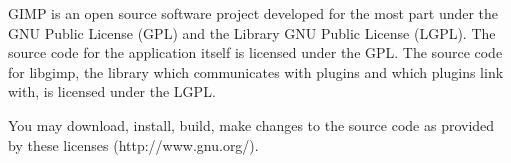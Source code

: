 GIMP is an open source software project developed for the most part under the
GNU Public License (GPL) and the Library GNU Public License (LGPL). The source
code for the application itself is licensed under the GPL. The source code for
libgimp, the library which communicates with plugins and which plugins link
with, is licensed under the LGPL.

You may download, install, build, make changes to the source code as provided
by these licenses (http://www.gnu.org/).
